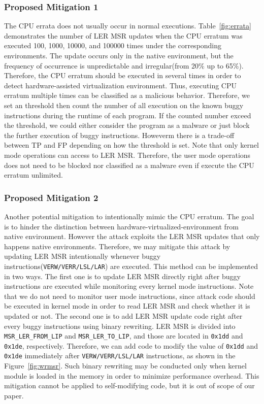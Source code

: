 \subsubsection{Proposed Mitigation 1}
The CPU errata does not usually occur in normal executions. Table~\ref{fig:errata} demonstrates the number of LER MSR updates when the CPU erratum was executed 100, 1000, 10000, and 100000 times under the corresponding environments. The update occurs only in the native environment, but the frequency of occurrence is unpredictable and irregular(from 20\% up to 65\%). Therefore, the CPU erratum should be executed in several times in order to detect hardware-assisted virtualization environment. Thus, executing CPU erratum multiple times can be classified as a malicious behavior. Therefore, we set an threshold then count the number of all execution on the known buggy instructions during the runtime of each program. If the counted number exceed the threshold, we could either consider the program as a malware or just block the further execution of buggy instructions. Howeverm there is a trade-off between TP and FP depending on how the threshold is set. Note that only kernel mode operations can access to LER MSR. Therefore, the user mode operations does not need to be blocked nor classified as a malware even if execute the CPU erratum unlimited.

\subsubsection{Proposed Mitigation 2}
Another potential mitigation to intentionally mimic the CPU erratum. The goal is to hinder the distinction between hardware-virtualized-environment from native environment. However the attack exploits the LER MSR updates that only happens native environments. Therefore, we may mitigate this attack by updating LER MSR intentionally whenever buggy instructions(\texttt{VERW/VERR/LSL/LAR}) are executed. This method can be implemented in two ways. The first one is to update LER MSR directly right after buggy instructions are executed while monitoring every kernel mode instructions. Note that we do not need to monitor user mode instructions, since attack code should be executed in kernel mode in order to read LER MSR and check whether it is updated or not. The second one is to add LER MSR update code right after every buggy instructions using binary rewriting. LER MSR is divided into {\tt MSR\_LER\_FROM\_LIP} and {\tt MSR\_LER\_TO\_LIP}, and those are located in {\tt 0x1dd} and {\tt 0x1de}, respectively. Therefore, we can add code to modify the value of {\tt0x1dd} and {\tt 0x1de} immediately after \texttt{VERW/VERR/LSL/LAR} instructions, as shown in the Figure~\ref{fig:wrmsr}. Such binary rewriting may be conducted only when kernel module is loaded in the memory in order to minimize performance overhead. This mitigation cannot be applied to self-modifying code, but it is out of scope of our paper.


